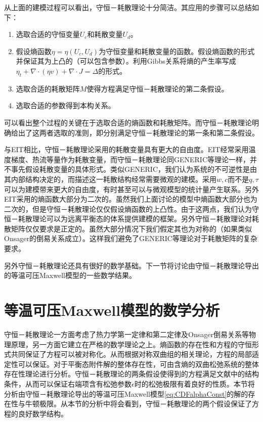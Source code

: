 从上面的建模过程可以看出，守恒－耗散理论十分简洁。其应用的步骤可以总结如下：
\begin{enumerate}
	\item 选取合适的守恒变量$U_c$和耗散变量$U_d$。
	\item 假设熵函数$\eta = \eta(U_c,U_d)$为守恒变量和耗散变量的函数。假设熵函数的形式并保证其为上凸的（可以包含参数）。利用Gibbs关系将熵的产生率写成$\eta_t+ \nabla \cdot (\eta v) + \nabla \cdot J = \Delta$的形式。
	\item 选取合适的耗散矩阵$M$使得方程满足守恒－耗散理论的第二条假设。
	\item 选取合适的参数得到本构关系。
\end{enumerate}
可以看出整个过程的关键在于选取合适的熵函数和耗散矩阵。而守恒－耗散理论明确给出了这两者选取的准则，即分别满足守恒－耗散理论的第一条和第二条假设。

与EIT相比，守恒－耗散理论采用的耗散变量具有更大的自由度。EIT经常采用温度梯度、热流等量作为耗散变量，而守恒－耗散理论同GENERIC等理论一样，并不事先假设耗散变量的具体形式。类似GENERIC，我们认为系统的不可逆性是由其内部结构决定的，而描述这一耗散结构经常需要微观的建模。采用$w,c$而不是$q,\tau$可以为建模带来更大的自由度，有时甚至可以与微观模型的统计量产生联系。另外EIT采用的熵函数大部分为二次的。虽然我们上面讨论的模型中熵函数大部分也为二次的，但是守恒－耗散理论仅仅假设熵函数的上凸性。由于这两点，我们认为守恒－耗散理论可以为远离平衡态的体系提供建模的框架。另外守恒－耗散理论对耗散矩阵仅仅要求是正定的。虽然大部分情况下我们假定其也为对称的（如果类似Onsager的倒易关系成立）。这样我们避免了GENERIC等理论对于耗散矩阵的复杂要求。

另外守恒－耗散理论还具有很好的数学基础。下一节将讨论由守恒－耗散理论导出的等温可压Maxwell模型的一些数学结果。

	\section{等温可压Maxwell模型的数学分析}
	守恒－耗散理论一方面考虑了热力学第一定律和第二定律及Onsager倒易关系等物理原理，另一方面它建立在严格的数学理论之上。熵函数的存在性和方程的守恒形式共同保证了方程可以被对称化。从而根据对称双曲组的相关理论，方程的局部适定性可以保证\cite{kato1975cauchy,majda2012compressible}。对于平衡态附件解的整体存在性，可由含熵的双曲松弛系统的整体存在性理论进行分析\cite{yong2004entropy,kawashima2009decay}。守恒－耗散理论的两条假设使得到的方程满足文献\cite{yong1999singular}中的结构条件，从而可以保证右端项含有松弛参数$\epsilon$时的松弛极限有着良好的性质。本节将分析由守恒－耗散理论导出的等温可压Maxwell模型\eqref{eq:CDFalphaConst}的解的存在性与牛顿极限。从本节的分析中将会看到，守恒－耗散理论的两个假设保证了方程的良好数学结构。

